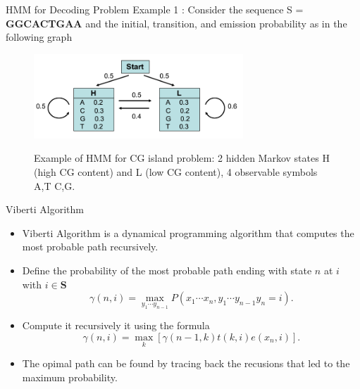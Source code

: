 \documentclass{beamer}
\begin{document}
\begin{frame}{HMM for Decoding Problem}
	Example 1 \cite{borodovsky2006problems}: Consider the sequence S = \textbf{GGCACTGAA} and the initial, transition, and emission probability as in the following graph
	\begin{figure}
		\centering
		\includegraphics[width = 0.7\textwidth]{example1.png}
		\label{fig:example1}
		\caption{Example of HMM for CG island problem: 2 hidden Markov states H (high CG content) and L (low CG content), 4 observable symbols A,T C,G.}
	\end{figure}
\end{frame} 
\begin{frame}{Viberti Algorithm}
	\begin{itemize}
		\item Viberti Algorithm is a dynamical programming algorithm that computes the most probable path recursively.
		\item Define the probability of the most probable path ending with state $n$ at $i$ with $i \in \textbf{S}$
		\begin{equation}
			\gamma(n, i) = \max_{y_1\cdots y_{n-1}} P(x_1\cdots x_n, y_1\cdots y_{n-1} y_n = i).
		\end{equation}
		\item Compute it recursively it using the formula
		\begin{equation}
			\gamma(n, i) = \max_k[\gamma(n-1,k) t(k,i) e(x_n, i)].
		\end{equation}
		\item The opimal path can be found by tracing back the recusions that led to the maximum probability.
	\end{itemize}
\end{frame}
\end{document}
